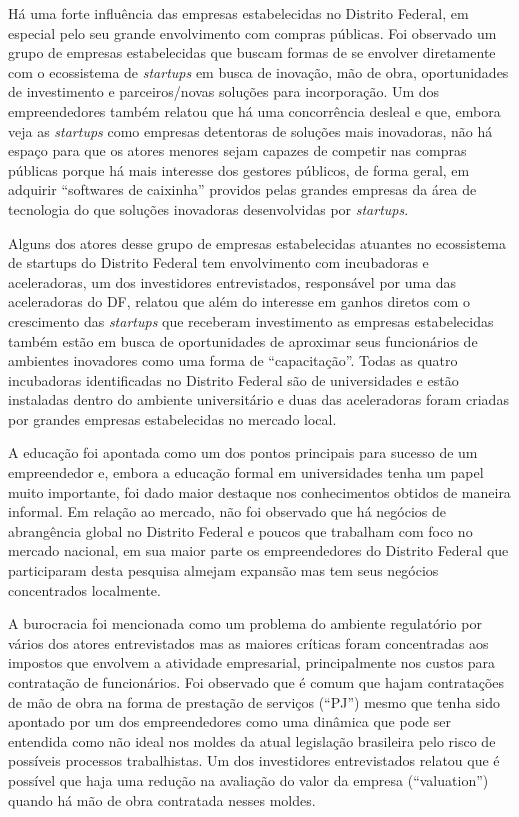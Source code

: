 Há uma forte influência das empresas estabelecidas no Distrito Federal, em especial pelo seu grande envolvimento com compras públicas. Foi observado um grupo de empresas estabelecidas que buscam formas de se envolver diretamente com o ecossistema de \textit{startups} em busca de inovação, mão de obra, oportunidades de investimento e parceiros/novas soluções para incorporação. Um dos empreendedores também relatou que há uma concorrência desleal e que, embora veja as \textit{startups} como empresas detentoras de soluções mais inovadoras, não há espaço para que os atores menores sejam capazes de competir nas compras públicas porque há mais interesse dos gestores públicos, de forma geral, em adquirir ``softwares de caixinha'' providos pelas grandes empresas da área de tecnologia do que soluções inovadoras desenvolvidas por \textit{startups}.

Alguns dos atores desse grupo de empresas estabelecidas atuantes no ecossistema de startups do Distrito Federal tem envolvimento com incubadoras e aceleradoras, um dos investidores entrevistados, responsável por uma das aceleradoras do DF, relatou que além do interesse em ganhos diretos com o crescimento das \textit{startups} que receberam investimento as empresas estabelecidas também estão em busca de oportunidades de aproximar seus funcionários de ambientes inovadores como uma forma de ``capacitação''. Todas as quatro incubadoras identificadas no Distrito Federal são de universidades e estão instaladas dentro do ambiente universitário e duas das aceleradoras foram criadas por grandes empresas estabelecidas no mercado local. 

A educação foi apontada como um dos pontos principais para sucesso de um empreendedor e, embora a educação formal em universidades tenha um papel muito importante, foi dado maior destaque nos conhecimentos obtidos de maneira informal. Em relação ao mercado, não foi observado que há negócios de abrangência global no Distrito Federal e poucos que trabalham com foco no mercado nacional, em sua maior parte os empreendedores do Distrito Federal que participaram desta pesquisa almejam expansão mas tem seus negócios concentrados localmente.

A burocracia foi mencionada como um problema do ambiente regulatório por vários dos atores entrevistados mas as maiores críticas foram concentradas aos impostos que envolvem a atividade empresarial, principalmente nos custos para contratação de funcionários. Foi observado que é comum que hajam contratações de mão de obra na forma de prestação de serviços (``PJ'') mesmo que tenha sido apontado por um dos empreendedores como uma dinâmica que pode ser entendida como não ideal nos moldes da atual legislação brasileira pelo risco de possíveis processos trabalhistas. Um dos investidores entrevistados relatou que é possível que haja uma redução na avaliação do valor da empresa (``valuation'') quando há mão de obra contratada nesses moldes.